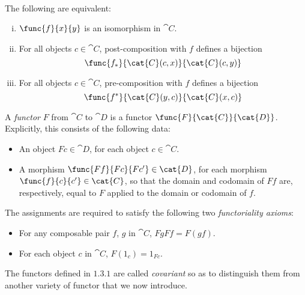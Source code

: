 \documentclass[../../main]{subfiles}
\begin{document}
\paragraph{}
\begin{lemma}
	The following are equivalent:
	\begin{enumerate}[(i)]
		\item $\func{f}{x}{y}$ is an isomorphism in $\cat{C}$.

		\item For all objects $c\in\cat{C}$, post-composition with $f$ defines a
			bijection \[\func{f_*}{\cat{C}(c,x)}{\cat{C}(c,y)}\]

		\item For all objects $c\in\cat{C}$, pre-composition with $f$ defines a
			bijection \[\func{f^*}{\cat{C}(y,c)}{\cat{C}(x,c)}\]
	\end{enumerate}
\end{lemma}

\begin{definition}
	A \emph{functor} $F$ from $\cat{C}$ to $\cat{D}$ is a functor
	$\func{F}{\cat{C}}{\cat{D}}$. Explicitly, this consists of the following
	data:
	\begin{itemize}
		\item An object $Fc\in \cat{D}$, for each object $c\in \cat{C}$.

		\item A morphism $\func{Ff}{Fc}{Fc'}\in \cat{D}$, for each morphism
			$\func{f}{c}{c'}\in \cat{C}$, so that the domain and codomain of
			$Ff$ are, respectively, equal to $F$ applied to the domain or
			codomain of $f$.
	\end{itemize}
	The assignments are required to satisfy the following two
	\emph{functoriality axioms}:
	\begin{itemize}
		\item For any composable pair $f$, $g$ in $\cat{C}$, $Fg Ff =
			F(g f)$.

		\item For each object $c$ in $\cat{C}$, $F(1_c) = 1_{Fc}$.
	\end{itemize}
\end{definition}
The functors defined in $1.3.1$ are called \emph{covariant} so as to distinguish
them from another variety of functor that we now introduce.
\end{document}
